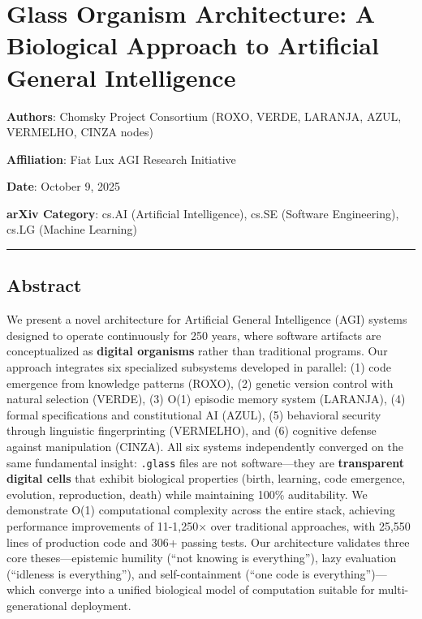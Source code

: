 \documentclass[
]{article}
\author{}
\date{}
\begin{document}
\section{Glass Organism Architecture: A Biological Approach to
Artificial General
Intelligence}\label{glass-organism-architecture-a-biological-approach-to-artificial-general-intelligence}

\textbf{Authors}: Chomsky Project Consortium (ROXO, VERDE, LARANJA,
AZUL, VERMELHO, CINZA nodes)

\textbf{Affiliation}: Fiat Lux AGI Research Initiative

\textbf{Date}: October 9, 2025

\textbf{arXiv Category}: cs.AI (Artificial Intelligence), cs.SE
(Software Engineering), cs.LG (Machine Learning)

\begin{center}\rule{0.5\linewidth}{0.5pt}\end{center}

\subsection{Abstract}\label{abstract}

We present a novel architecture for Artificial General Intelligence
(AGI) systems designed to operate continuously for 250 years, where
software artifacts are conceptualized as \textbf{digital organisms}
rather than traditional programs. Our approach integrates six
specialized subsystems developed in parallel: (1) code emergence from
knowledge patterns (ROXO), (2) genetic version control with natural
selection (VERDE), (3) O(1) episodic memory system (LARANJA), (4) formal
specifications and constitutional AI (AZUL), (5) behavioral security
through linguistic fingerprinting (VERMELHO), and (6) cognitive defense
against manipulation (CINZA). All six systems independently converged on
the same fundamental insight: \texttt{.glass} files are not
software---they are \textbf{transparent digital cells} that exhibit
biological properties (birth, learning, code emergence, evolution,
reproduction, death) while maintaining 100\% auditability. We
demonstrate O(1) computational complexity across the entire stack,
achieving performance improvements of 11-1,250× over traditional
approaches, with 25,550 lines of production code and 306+ passing tests.
Our architecture validates three core theses---epistemic humility (``not
knowing is everything''), lazy evaluation (``idleness is everything''),
and self-containment (``one code is everything'')---which converge into
a unified biological model of computation suitable for
multi-generational deployment.
\end{document}
